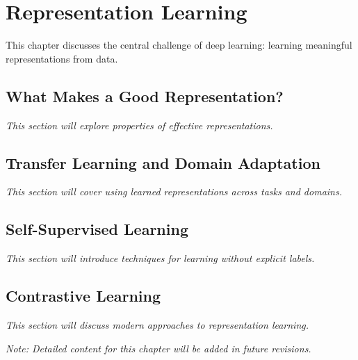 
\chapter{Representation Learning}
\label{chap:representation-learning}

This chapter discusses the central challenge of deep learning: learning meaningful representations from data.

\section{What Makes a Good Representation?}

\textit{This section will explore properties of effective representations.}

\section{Transfer Learning and Domain Adaptation}

\textit{This section will cover using learned representations across tasks and domains.}

\section{Self-Supervised Learning}

\textit{This section will introduce techniques for learning without explicit labels.}

\section{Contrastive Learning}

\textit{This section will discuss modern approaches to representation learning.}

\vspace{1em}
\noindent\textit{Note: Detailed content for this chapter will be added in future revisions.}
